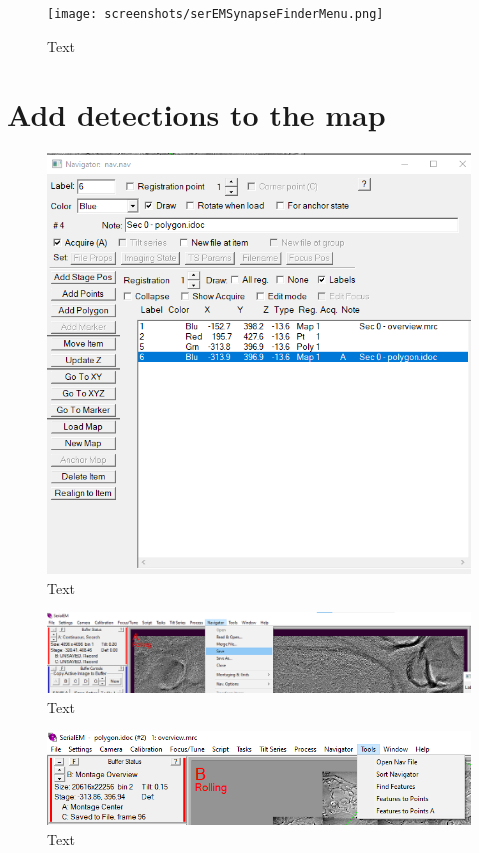 \documentclass[12pt, a4paper]{scrartcl}
\begin{document}
\begin{figure}[H]
\texttt{[image: screenshots/serEMSynapseFinderMenu.png]}
\caption{Text}
\end{figure}


\section{Add detections to the map}

\begin{figure}[H]
\includegraphics[scale=1]{screenshots/NavigatorAcquireMap.png}
\caption{Text}
\end{figure}

\begin{figure}[H]
\includegraphics[width=\linewidth]{screenshots/NavigatorSave.png}
\caption{Text}
\end{figure}

\begin{figure}[H]
\includegraphics[width=\linewidth]{screenshots/Tools.png}
\caption{Text}
\end{figure}
\end{document}
